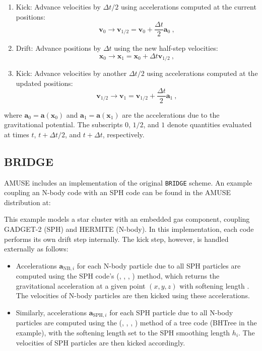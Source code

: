 \begin{enumerate}
	\item Kick: Advance velocities by $\Delta t/2$ using accelerations computed at the current positions:
	\[
	\mathbf{v}_0 \to \mathbf{v}_{1/2} = \mathbf{v}_0 + \frac{\Delta t}{2}\mathbf{a}_0~,
	\]
	\item Drift: Advance positions by $\Delta t$ using the new half-step velocities:
	\[
	\mathbf{x}_0 \to \mathbf{x}_1 = \mathbf{x}_0 + \Delta t \mathbf{v}_{1/2}~,
	\]
	\item Kick: Advance velocities by another $\Delta t/2$ using accelerations computed at the updated positions:
	\[
	\mathbf{v}_{1/2} \to \mathbf{v}_1 = \mathbf{v}_{1/2} + \frac{\Delta t}{2}\mathbf{a}_1~,
	\]
\end{enumerate}
where $\mathbf{a}_0 = \mathbf{a}(\mathbf{x}_0)$ and $\mathbf{a}_1 = \mathbf{a}(\mathbf{x}_1)$ are the accelerations due to the gravitational potential. The subscripts $0$, $1/2$, and $1$ denote quantities evaluated at times $t$, $t + \Delta t/2$, and $t + \Delta t$, respectively.

\subsection{BRIDGE}
\label{sec:3.4.2_Bridge}

AMUSE includes an implementation of the original \texttt{BRIDGE} scheme. An example coupling an N-body code with an SPH code can be found in the AMUSE distribution at:


This example models a star cluster with an embedded gas component, coupling GADGET-2 (SPH) and HERMITE (N-body). In this implementation, each code performs its own drift step internally. The kick step, however, is handled externally as follows:

\begin{itemize}
	\item Accelerations $\mathbf{a}_{\mathrm{NB},i}$ for each N-body particle due to all SPH particles are computed using the SPH code's (, , , ) method, which returns the gravitational acceleration at a given point $(x,y,z)$ with softening length . The velocities of N-body particles are then kicked using these accelerations.
	\item Similarly, accelerations $\mathbf{a}_{\mathrm{SPH},i}$ for each SPH particle due to all N-body particles are computed using the (, , , ) method of a tree code (BHTree in the example), with the softening length set to the SPH smoothing length $h_i$. The velocities of SPH particles are then kicked accordingly.
\end{itemize}

